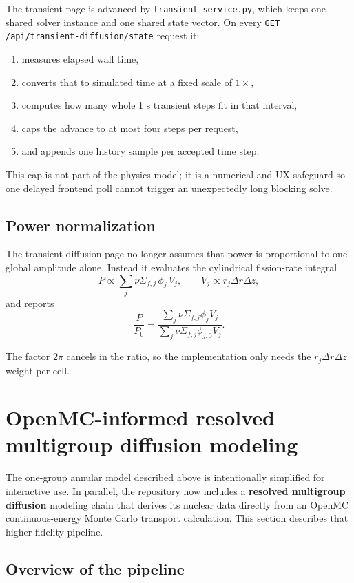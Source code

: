 \documentclass[11pt]{article}
\begin{document}
The transient page is advanced by \texttt{transient\_service.py}, which keeps one
shared solver instance and one shared state vector.  On every
\texttt{GET /api/transient-diffusion/state} request it:
\begin{enumerate}
  \item measures elapsed wall time,
  \item converts that to simulated time at a fixed scale of $1\times$,
  \item computes how many whole 1 s transient steps fit in that interval,
  \item caps the advance to at most four steps per request,
  \item and appends one history sample per accepted time step.
\end{enumerate}

This cap is not part of the physics model; it is a numerical and UX safeguard so
one delayed frontend poll cannot trigger an unexpectedly long blocking solve.

\subsection{Power normalization}

The transient diffusion page no longer assumes that power is proportional to one
global amplitude alone.  Instead it evaluates the cylindrical fission-rate
integral
\[
P \propto \sum_j \nu\Sigma_{f,j}\,\phi_j\,V_j,
\qquad
V_j \propto r_j \Delta r \Delta z,
\]
and reports
\[
\frac{P}{P_0}
=
\frac{\sum_j \nu\Sigma_{f,j}\phi_j V_j}
{\sum_j \nu\Sigma_{f,j}\phi_{j,0} V_j}.
\]

The factor $2\pi$ cancels in the ratio, so the implementation only needs the
$r_j \Delta r \Delta z$ weight per cell.

\section{OpenMC-informed resolved multigroup diffusion modeling}

The one-group annular model described above is intentionally simplified for
interactive use.  In parallel, the repository now includes a
\textbf{resolved multigroup diffusion} modeling chain that derives its nuclear
data directly from an OpenMC continuous-energy Monte Carlo transport
calculation.  This section describes that higher-fidelity pipeline.

\subsection{Overview of the pipeline}
\end{document}

